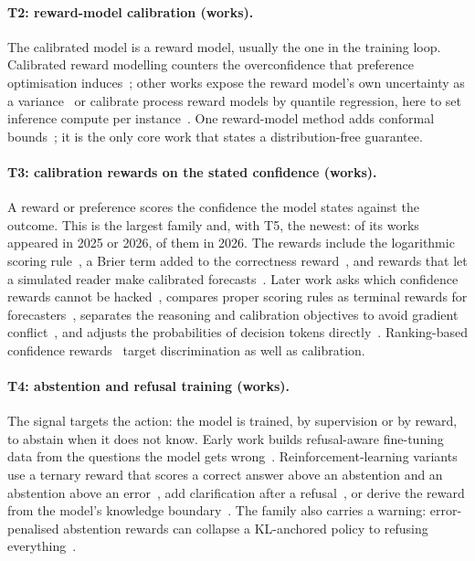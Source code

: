 \paragraph{T2: reward-model calibration (\nTTwo works).} The calibrated model is a reward model, usually the one in
the training loop. Calibrated reward modelling counters the overconfidence that preference optimisation
induces~\citep{leng2024taming}; other works expose the reward model's own uncertainty as a
variance~\citep{lou2024uncertaintyaware} or calibrate process reward models by quantile regression, here to set inference compute per
instance~\citep{park2025know}. One reward-model method adds conformal
bounds~\citep{pan2026uncertaintyaware}; it is the only core work that states a distribution-free
guarantee.

\paragraph{T3: calibration rewards on the stated confidence (\nTThree works).} A reward or preference
scores the confidence the model states against the outcome. This is the largest family and, with T5, the newest:
\nTThreeRecent of its \nTThree works appeared in 2025 or 2026, \nTThreeTwentySix of them in 2026. The
rewards include the logarithmic scoring rule~\citep{baniharouni2025rewarding}, a Brier term added to the
correctness reward~\citep{damani2025beyond}, and rewards that let a simulated reader make calibrated
forecasts~\citep{band2024linguistic}. Later work asks which confidence rewards cannot be
hacked~\citep{tan2026on}, compares proper scoring rules as terminal rewards for
forecasters~\citep{turtel2026how}, separates the reasoning and calibration objectives to avoid
gradient conflict~\citep{ma2026decoupling}, and adjusts the probabilities of decision tokens
directly~\citep{yaldiz2026balancing}. Ranking-based confidence rewards~\citep{wang2026calibrationaware}
target discrimination as well as calibration.

\paragraph{T4: abstention and refusal training (\nTFour works).} The signal targets the action: the model
is trained, by supervision or by reward, to abstain when it does not know. Early work builds refusal-aware
fine-tuning data from the questions the model gets wrong~\citep{zhang2023rtuning,yang2023alignment}.
Reinforcement-learning variants use a ternary reward that scores a correct answer above an abstention
and an abstention above an error~\citep{wei2025truthrl,mohamadi2025honesty}, add clarification after a
refusal~\citep{zhai2026abstainr1}, or derive the reward from the model's knowledge
boundary~\citep{gao2026karl}. The family also carries a warning: error-penalised abstention rewards can
collapse a KL-anchored policy to refusing everything~\citep{che2026abstention}.

